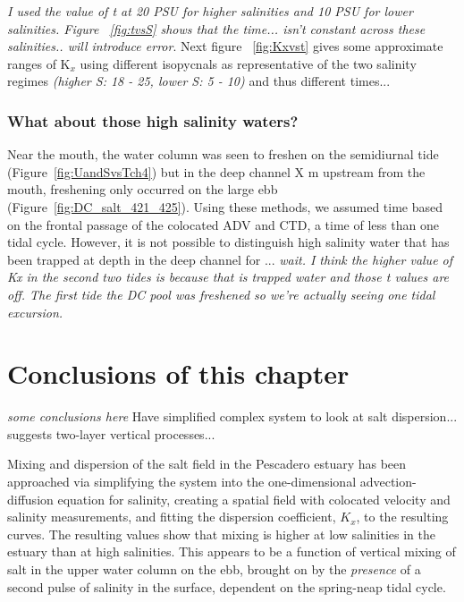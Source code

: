 \emph{I used the value of t at 20 PSU for higher salinities and 10 PSU for lower salinities.  Figure ~\ref{fig:tvsS} shows that the time... isn't constant across these salinities.. will introduce error}.  Next figure ~\ref{fig:Kxvst} gives some approximate ranges of K$_x$ using different isopycnals as representative of the two salinity regimes \emph{(higher S: 18 - 25, lower S: 5 - 10)} and thus different times... 


\subsubsection{What about those high salinity waters?}
Near the mouth, the water column was seen to freshen on the semidiurnal tide (Figure~\ref{fig:UandSvsTch4}) but in the deep channel X m upstream from the mouth, freshening only occurred on the large ebb (Figure~\ref{fig:DC_salt_421_425}). Using these methods, we assumed time based on the frontal passage of the colocated ADV and CTD, a time of less than one tidal cycle. However, it is not possible to distinguish high salinity water that has been trapped at depth in the deep channel for ... \emph{wait. I think the higher value of Kx in the second two tides is because that is trapped water and those t values are off. The first tide the DC pool was freshened so we're actually seeing one tidal excursion.}

\section{Conclusions of this chapter}
\emph{some conclusions here}
Have simplified complex system to look at salt dispersion... suggests two-layer vertical processes... 

Mixing and dispersion of the salt field in the Pescadero estuary has been approached via simplifying the system into the one-dimensional advection-diffusion equation for salinity, creating a spatial field with colocated velocity and salinity measurements, and fitting the dispersion coefficient, $K_x$, to the resulting curves. The resulting values show that mixing is higher at low salinities in the estuary than at high salinities. This appears to be a function of vertical mixing of salt in the upper water column on the ebb, brought on by the \emph{presence} of a second pulse of salinity in the surface, dependent on the spring-neap tidal cycle.  






